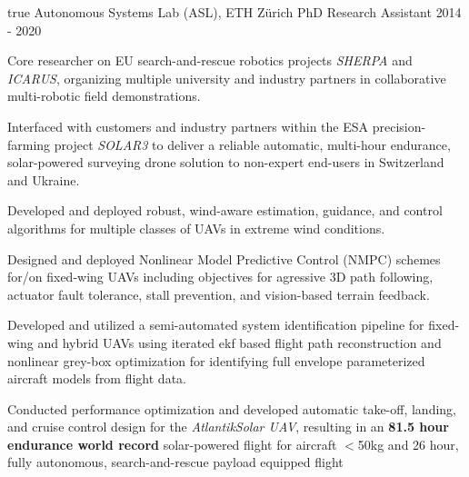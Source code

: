 \begin{cventries}
{\begin{cvitems}
      \end{cvitems}
    } %
    {} %
    {true}
    {}
%
\cvexpentry
  	{Autonomous Systems Lab (ASL), ETH Z\"{u}rich} %
  	{PhD Research Assistant} %
    {} %
    {2014 - 2020} %
    {
      \begin{cvitems} %
      	\item Core researcher on EU search-and-rescue robotics projects \emph{SHERPA} and \emph{ICARUS}, organizing multiple university and industry partners in collaborative multi-robotic field demonstrations. 
		\item Interfaced with customers and industry partners within the ESA precision-farming project \emph{SOLAR3} to deliver a reliable automatic, multi-hour endurance, solar-powered surveying drone solution to non-expert end-users in Switzerland and Ukraine.      	
      	\item Developed and deployed robust, wind-aware estimation, guidance, and control algorithms for multiple classes of UAVs in extreme wind conditions.
      	\item Designed and deployed Nonlinear Model Predictive Control (NMPC) schemes for/on fixed-wing UAVs including objectives for agressive 3D path following, actuator fault tolerance, stall prevention, and vision-based terrain feedback.
      	\item Developed and utilized a semi-automated system identification pipeline for fixed-wing and hybrid UAVs using iterated ekf based flight path reconstruction and nonlinear grey-box optimization for identifying full envelope parameterized aircraft models from flight data.
      	\item Conducted performance optimization and developed automatic take-off, landing, and cruise control design for the \emph{AtlantikSolar UAV}, resulting in an \textbf{81.5 hour endurance world record} solar-powered flight for aircraft $<$50kg  and 26 hour, fully autonomous, search-and-rescue payload equipped flight 

\end{cvitems}}
\end{cventries}
